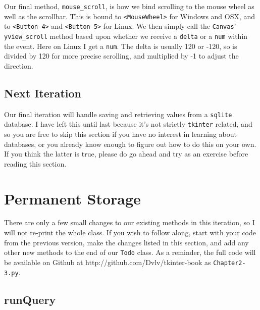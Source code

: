 \documentclass[a4paper,11pt,openany]{book}
\newcommand{\myGithub}{http://github.com/Dvlv/tkinter-book}
\begin{document}
Our final method, \lstinline[columns=fixed]{mouse_scroll}, is how we bind scrolling to the mouse wheel as well as the scrollbar. This is bound to \lstinline[columns=fixed]{<MouseWheel>} for Windows and OSX, and to \lstinline[columns=fixed]{<Button-4>} and \lstinline[columns=fixed]{<Button-5>} for Linux. We then simply call the \lstinline[columns=fixed]{Canvas}' \lstinline[columns=fixed]{yview_scroll} method based upon whether we receive a \lstinline[columns=fixed]{delta} or a \lstinline[columns=fixed]{num} within the event. Here on Linux I get a \lstinline[columns=fixed]{num}. The delta is usually 120 or -120, so is divided by 120 for more precise scrolling, and multiplied by -1 to adjust the direction.  

\subsection{Next Iteration}

Our final iteration will handle saving and retrieving values from a \lstinline[columns=fixed]{sqlite} database. I have left this until last because it's not strictly \lstinline[columns=fixed]{tkinter} related, and so you are free to skip this section if you have no interest in learning about databases, or you already know enough to figure out how to do this on your own. If you think the latter is true, please do go ahead and try as an exercise before reading this section. 

\newpage

\section{Permanent Storage}

There are only a few small changes to our existing methods in this iteration, so I will not re-print the whole class. If you wish to follow along, start with your code from the previous version, make the changes listed in this section, and add any other new methods to the end of our \lstinline[columns=fixed]{Todo} class. As a reminder, the full code will be available on Github at \myGithub{} as \lstinline[columns=fixed]{Chapter2-3.py}.



\newpage

\subsection{runQuery}
\end{document}
